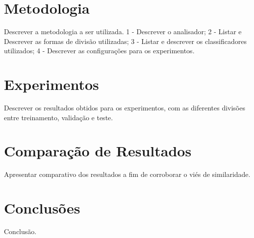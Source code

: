 \documentclass[letterpaper]{article}
\begin{document}
\section{Metodologia}

Descrever a metodologia a ser utilizada.
1 - Descrever o analisador; 2 - Listar e Descrever as formas de divisão utilizadas; 3 - Listar e descrever os classificadores utilizados; 4 - Descrever as configurações para os experimentos.

\section{Experimentos}

Descrever os resultados obtidos para os experimentos, com as diferentes divisões entre treinamento, validação e teste.

\section{Comparação de Resultados}

Apresentar comparativo dos resultados a fim de corroborar o viés de similaridade.

\section{Conclusões}

Conclusão.



\end{document}
